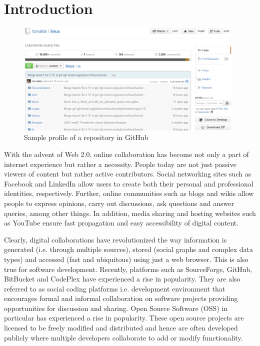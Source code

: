 
\section{Introduction}
\label{sec:introduction}
\begin{figure}[ht]
	\centering
	\includegraphics[width=0.98\textwidth]{./img/linux.png}
	\caption{Sample profile of a repository in GitHub}
	\label{fig:ghrepo}
\end{figure}
With the advent of Web 2.0, online collaboration has become not only a part of internet experience but rather a necessity. People today are not just passive viewers of content but rather active contributors. Social networking sites such as Facebook and LinkedIn allow users to create both their personal and professional identities, respectively. Further, online communities such as blogs and wikis allow people to express opinions, carry out discussions, ask questions and answer queries, among other things. In addition, media sharing and hosting websites such as YouTube ensure fast propagation and easy accessibility of digital content.

Clearly, digital collaborations have revolutionized the way information is generated (i.e. through multiple sources), stored (social graphs and complex data types) and accessed (fast and ubiquitous) using just a web browser. This is also true for software development. Recently, platforms such as SourceForge, GitHub, BitBucket and CodePlex have experienced a rise in popularity. They are also referred to as social coding platforms i.e. development environment that encourages formal and informal collaboration on software projects providing opportunities for discussion and sharing. Open Source Software (OSS) in particular has experienced a rise in popularity. These open source projects are licensed to be freely modified and distributed and hence are often developed publicly where multiple developers collaborate to add or modify functionality.

